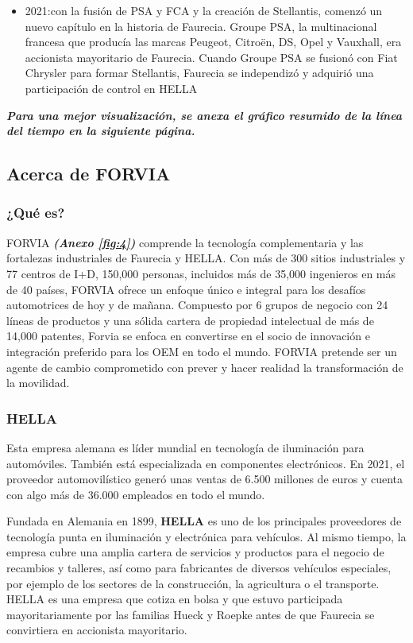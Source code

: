\documentclass[letterpaper,12pt]{article}
\begin{document}
\begin{sloppypar}
\begin{itemize}
    \item 2021:con la fusión de PSA y FCA y la creación de Stellantis, comenzó un nuevo capítulo en la historia de Faurecia. Groupe PSA, la multinacional francesa que producía las marcas Peugeot, Citroën, DS, Opel y Vauxhall, era accionista mayoritario de Faurecia. Cuando Groupe PSA se fusionó con Fiat Chrysler para formar Stellantis, Faurecia se independizó y adquirió una participación de control en HELLA
\end{itemize}
\begin{center}
    \textbf{\textit{Para una mejor visualización, se anexa el gráfico resumido de la línea del tiempo en la siguiente página.}}
\end{center}
\newpage



\newpage
\subsection{\textcolor[rgb]{0.9,0.3,0.3}{Acerca de FORVIA}}
\subsubsection{¿Qué es?}
FORVIA\textbf{ \textit{(Anexo \ref{fig:4})}} comprende la tecnología complementaria y las fortalezas industriales de Faurecia y HELLA. Con más de 300 sitios industriales y 77 centros de I+D, 150,000 personas, incluidos más de 35,000 ingenieros en más de 40 países, FORVIA ofrece un enfoque único e integral para los desafíos automotrices de hoy y de mañana. Compuesto por 6 grupos de negocio con 24 líneas de productos y una sólida cartera de propiedad intelectual de más de 14,000 patentes, Forvia se enfoca en convertirse en el socio de innovación e integración preferido para los OEM en todo el mundo. FORVIA pretende ser un agente de cambio comprometido con prever y hacer realidad la transformación de la movilidad.
\subsubsection{HELLA}
Esta empresa alemana es líder mundial en tecnología de iluminación para automóviles. También está especializada en componentes electrónicos. En 2021, el proveedor automovilístico generó unas ventas de 6.500 millones de euros y cuenta con algo más de 36.000 empleados en todo el mundo.

Fundada en Alemania en 1899, \textbf{HELLA} es uno de los principales proveedores de tecnología punta en iluminación y electrónica para vehículos. Al mismo tiempo, la empresa cubre una amplia cartera de servicios y productos para el negocio de recambios y talleres, así como para fabricantes de diversos vehículos especiales, por ejemplo de los sectores de la construcción, la agricultura o el transporte. HELLA es una empresa que cotiza en bolsa y que estuvo participada mayoritariamente por las familias Hueck y Roepke antes de que Faurecia se convirtiera en accionista mayoritario.


\end{sloppypar}
\end{document}
